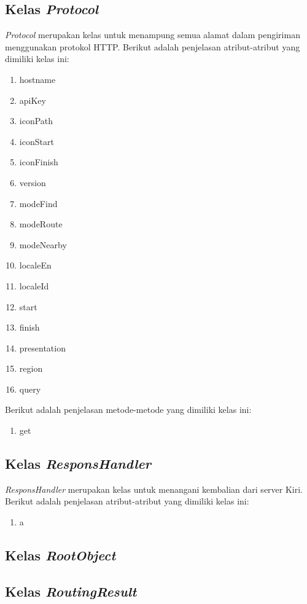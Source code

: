 \subsection{Kelas \textit{Protocol}}
\label{lab:Kelas Protocol}
\hspace{0.5cm} \textit{Protocol} merupakan kelas untuk menampung semua alamat dalam pengiriman menggunakan protokol HTTP. Berikut adalah penjelasan atribut-atribut yang dimiliki kelas ini:
\begin{enumerate}
	\item hostname
	\item apiKey
	\item iconPath
	\item iconStart
	\item iconFinish
	
	\item version
	
	\item modeFind
	\item modeRoute
	\item modeNearby
	
	\item localeEn
	\item localeId
	
	\item start
	\item finish
	
	\item presentation
	
	\item region 
	\item query
\end{enumerate}

Berikut adalah penjelasan metode-metode yang dimiliki kelas ini:
\begin{enumerate}
	\item get
\end{enumerate}


\subsection{Kelas \textit{ResponsHandler}}
\label{lab:Kelas ResponsHandler}
\hspace{0.5cm} \textit{ResponsHandler} merupakan kelas untuk menangani kembalian dari server Kiri. Berikut adalah penjelasan atribut-atribut yang dimiliki kelas ini:
\begin{enumerate}
	\item a
\end{enumerate}

\subsection{Kelas \textit{RootObject}}
\label{lab:Kelas RootObject}

\subsection{Kelas \textit{RoutingResult}}
\label{lab:Kelas RoutingResult}

